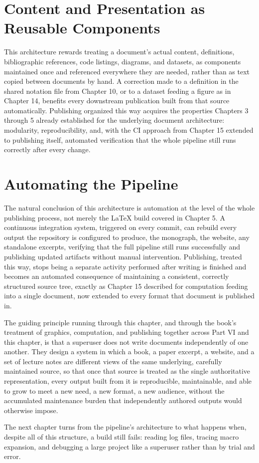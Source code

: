 \hypertarget{content-and-presentation-as-reusable-components}{%
\section{Content and Presentation as Reusable Components}\label{content-and-presentation-as-reusable-components}}

This architecture rewards treating a document's actual content, definitions, bibliographic references, code listings, diagrams, and datasets, as components maintained once and referenced everywhere they are needed, rather than as text copied between documents by hand. A correction made to a definition in the shared notation file from Chapter 10, or to a dataset feeding a figure as in Chapter 14, benefits every downstream publication built from that source automatically. Publishing organized this way acquires the properties Chapters 3 through 5 already established for the underlying document architecture: modularity, reproducibility, and, with the CI approach from Chapter 15 extended to publishing itself, automated verification that the whole pipeline still runs correctly after every change.

\hypertarget{automating-the-pipeline}{%
\section{Automating the Pipeline}\label{automating-the-pipeline}}

The natural conclusion of this architecture is automation at the level of the whole publishing process, not merely the LaTeX build covered in Chapter 5. A continuous integration system, triggered on every commit, can rebuild every output the repository is configured to produce, the monograph, the website, any standalone excerpts, verifying that the full pipeline still runs successfully and publishing updated artifacts without manual intervention. Publishing, treated this way, stops being a separate activity performed after writing is finished and becomes an automated consequence of maintaining a consistent, correctly structured source tree, exactly as Chapter 15 described for computation feeding into a single document, now extended to every format that document is published in.

The guiding principle running through this chapter, and through the book's treatment of graphics, computation, and publishing together across Part VI and this chapter, is that a superuser does not write documents independently of one another. They design a system in which a book, a paper excerpt, a website, and a set of lecture notes are different views of the same underlying, carefully maintained source, so that once that source is treated as the single authoritative representation, every output built from it is reproducible, maintainable, and able to grow to meet a new need, a new format, a new audience, without the accumulated maintenance burden that independently authored outputs would otherwise impose.

The next chapter turns from the pipeline's architecture to what happens when, despite all of this structure, a build still fails: reading log files, tracing macro expansion, and debugging a large project like a superuser rather than by trial and error.
